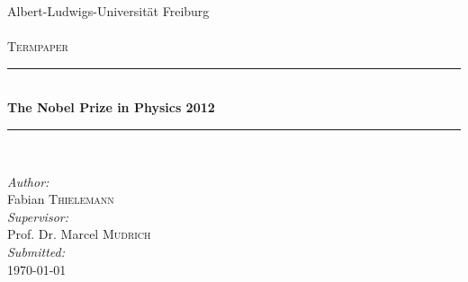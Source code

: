 \begin{titlepage}
\begin{center}

{\large \uppercase Albert-Ludwigs-Universität Freiburg}\\
[1cm]
\textsc{\LARGE }\\
[1.cm]

\textsc{\Large Termpaper}\\
[0.5cm]

\hrule ~\\ [0.4cm]
{ \huge \bfseries The Nobel Prize in Physics 2012 \\[0.6cm]}
\hrule ~\\ [3cm]

\end{center}
\vfill
\textit{Author:}\\
Fabian \textsc{Thielemann}\\
[0.5cm]
\textit{Supervisor:}\\
Prof. Dr. Marcel \textsc{Mudrich}\\
[0.5cm]
\textit{Submitted:}\\
\today


\end{titlepage}
